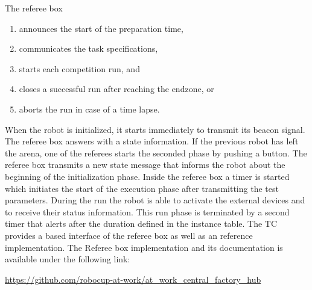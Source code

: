 The referee box
\begin{enumerate}
  \item announces the start of the preparation time,
  \item communicates the task specifications,
  \item starts each competition run, and
  \item closes a successful run after reaching the endzone, or
  \item aborts the run in case of a time lapse.
\end{enumerate}

When the robot is initialized, it starts immediately to transmit its beacon 
signal. The referee box answers with a state information. If the previous robot 
has left the arena, one of the referees starts the seconded phase by pushing a 
button. The referee box transmits a new state message that informs the robot 
about the beginning of the initialization phase. Inside the referee box a 
timer is started which initiates the start of the execution phase after 
transmitting the test parameters. During the run the robot is able to activate 
the external devices and to receive their status information. This run phase is 
terminated by a second timer that alerts after the duration defined in the 
instance table.
% 
% 
The TC provides a  based interface of the referee box as well as 
an reference implementation.
The Referee box implementation and its documentation is available under the following link:
\begin{center}
\url{https://github.com/robocup-at-work/at_work_central_factory_hub}	

\end{center}




